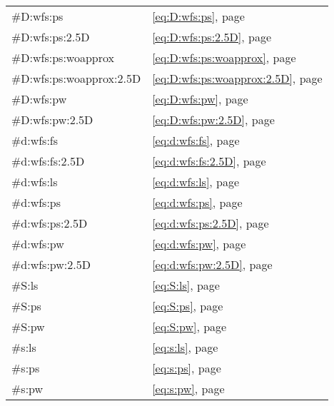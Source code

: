\begin{tabular}{ll}
    \#D:wfs:ps                & \eqref{eq:D:wfs:ps},                  page \pageref{eq:D:wfs:ps} \\
    \#D:wfs:ps:2.5D           & \eqref{eq:D:wfs:ps:2.5D},             page \pageref{eq:D:wfs:ps:2.5D} \\
    \#D:wfs:ps:woapprox       & \eqref{eq:D:wfs:ps:woapprox},         page \pageref{eq:D:wfs:ps:woapprox} \\
    \#D:wfs:ps:woapprox:2.5D  & \eqref{eq:D:wfs:ps:woapprox:2.5D},    page \pageref{eq:D:wfs:ps:woapprox:2.5D} \\
    \#D:wfs:pw                & \eqref{eq:D:wfs:pw},                  page \pageref{eq:D:wfs:pw} \\
    \#D:wfs:pw:2.5D           & \eqref{eq:D:wfs:pw:2.5D},             page \pageref{eq:D:wfs:pw:2.5D} \\
    \#d:wfs:fs                & \eqref{eq:d:wfs:fs},                  page \pageref{eq:d:wfs:fs} \\
    \#d:wfs:fs:2.5D           & \eqref{eq:d:wfs:fs:2.5D},             page \pageref{eq:d:wfs:fs:2.5D} \\
    \#d:wfs:ls                & \eqref{eq:d:wfs:ls},                  page \pageref{eq:d:wfs:ls} \\
    \#d:wfs:ps                & \eqref{eq:d:wfs:ps},                  page \pageref{eq:d:wfs:ps} \\
    \#d:wfs:ps:2.5D           & \eqref{eq:d:wfs:ps:2.5D},             page \pageref{eq:d:wfs:ps:2.5D} \\
    \#d:wfs:pw                & \eqref{eq:d:wfs:pw},                  page \pageref{eq:d:wfs:pw} \\
    \#d:wfs:pw:2.5D           & \eqref{eq:d:wfs:pw:2.5D},             page \pageref{eq:d:wfs:pw:2.5D} \\
    \#S:ls                    & \eqref{eq:S:ls},                      page \pageref{eq:S:ls} \\
    \#S:ps                    & \eqref{eq:S:ps},                      page \pageref{eq:S:ps} \\
    \#S:pw                    & \eqref{eq:S:pw},                      page \pageref{eq:S:pw} \\
    \#s:ls                    & \eqref{eq:s:ls},                      page \pageref{eq:s:ls} \\
    \#s:ps                    & \eqref{eq:s:ps},                      page \pageref{eq:s:ps} \\
    \#s:pw                    & \eqref{eq:s:pw},                      page \pageref{eq:s:pw} \\

\end{tabular}
